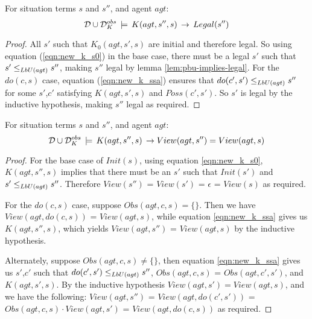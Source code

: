 \begin{lemma}
\label{lem:K-implies-legal}For situation terms $s$ and $s''$, and
agent $agt$:\[
\mathcal{D}\cup\mathcal{D}_{K}^{obs}\,\models\, K(agt,s'',s)\,\rightarrow\, Legal(s'')\]

\end{lemma}
\begin{proof}
All $s'$ such that $K_{0}(agt,s',s)$ are initial and therefore legal.
So using equation (\ref{eqn:new_k_s0}) in the base case, there must
be a legal $s'$ such that $s'\leq_{LbU(agt)}s''$, making $s''$
legal by lemma \ref{lem:pbu-implies-legal}. For the $do(c,s)$ case,
equation (\ref{eqn:new_k_ssa}) ensures that $do(c',s')\leq_{LbU(agt)}s''$
for some $s'$,$c'$ satisfying $K(agt,s',s)$ and $Poss(c',s')$.
So $s'$ is legal by the inductive hypothesis, making $s''$ legal
as required. 
\end{proof}
\medskip{}
\newpage{}

\begin{lemma}
\label{lem:K-implies-view}For situation terms $s$ and $s''$, and
agent $agt$:\[
\mathcal{D}\cup\mathcal{D}_{K}^{obs}\,\models\, K(agt,s'',s)\,\rightarrow View(agt,s'')=View(agt,s)\]

\end{lemma}
\begin{proof}
For the base case of $Init(s)$, using equation \eqref{eqn:new_k_s0},
$K(agt,s'',s)$ implies that there must be an $s'$ such that $Init(s')$
and $s'\leq_{LbU(agt)}s''$. Therefore $View(s'')$ = $View(s')$
= $\epsilon$ = $View(s)$ as required.

For the $do(c,s)$ case, suppose $Obs(agt,c,s)=\{\}$. Then we have
$View(agt,do(c,s))$ = $View(agt,s)$, while equation \eqref{eqn:new_k_ssa}
gives us $K(agt,s'',s)$, which yields $View(agt,s'')$ = $View(agt,s)$
by the inductive hypothesis. 

Alternately, suppose $Obs(agt,c,s)\neq\{\}$, then equation \eqref{eqn:new_k_ssa}
gives us $s'$,$c'$ such that $do(c',s')\leq_{LbU(agt)}s''$, $Obs(agt,c,s)$
= $Obs(agt,c',s')$, and $K(agt,s',s)$. By the inductive hypothesis
$View(agt,s')=View(agt,s)$, and we have the following: $View(agt,s'')$
= $View(agt,do(c',s'))$ = $Obs(agt,c,s)\cdot View(agt,s')$ = $View(agt,do(c,s))$
as required. 
\end{proof}
\medskip{}


